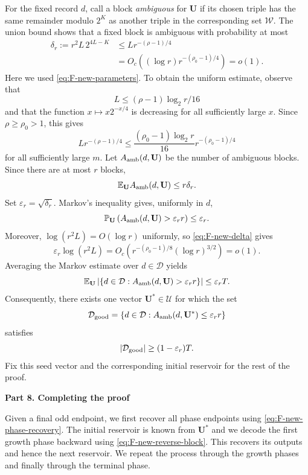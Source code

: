 \documentclass{article}
\theoremstyle{definition}
\begin{document}
For the fixed record $d$, call a block \emph{ambiguous} for $\mathbf U$ if
its chosen triple has the same remainder modulo $2^K$ as another triple in the
corresponding set $\mathcal W$.  The union bound shows that a fixed block is
ambiguous with probability at most
\begin{equation}
\begin{aligned}
\delta_r:=r^2L\,2^{4L-K}
&\le Lr^{-(\rho-1)/4}\\
&=O_c\left((\log r)r^{-(\rho_0-1)/4}\right)=o(1).
\end{aligned}
\label{eq:F-new-delta}
\end{equation}
Here we used \eqref{eq:F-new-parameters}. To obtain the
uniform estimate, observe that $$L\le(\rho-1)\log_2r/16$$
and that the function $x\mapsto x2^{-x/4}$ is decreasing
for all sufficiently large $x$. Since $\rho\ge\rho_0>1$,
this gives
$$
Lr^{-(\rho-1)/4}
\le\frac{(\rho_0-1)\log_2r}{16}
 r^{-(\rho_0-1)/4}
$$
for all sufficiently large $m$.  Let
$A_{\rm amb}(d,\mathbf U)$ be the number of ambiguous blocks.  Since there
are at most $r$ blocks,
$$
 \mathbb E_{\mathbf U}A_{\rm amb}(d,\mathbf U)\leq r\delta_r.
$$
Set $\varepsilon_r=\sqrt{\delta_r}$.  Markov's inequality gives, uniformly in
$d$,
$$
 \mathbb P_{\mathbf U}
 \left(A_{\rm amb}(d,\mathbf U)>\varepsilon_rr\right)
 \leq\varepsilon_r.
$$
Moreover, $\log(r^2L)=O(\log r)$ uniformly, so
\eqref{eq:F-new-delta} gives
\begin{equation}
\varepsilon_r\log(r^2L)
=O_c\left(r^{-(\rho_0-1)/8}(\log r)^{3/2}\right)=o(1).
\label{eq:F-new-epsilon}
\end{equation}
Averaging the Markov estimate over $d\in\mathcal D$ yields
$$
 \mathbb E_{\mathbf U}
 \left|\{d\in\mathcal D:
 A_{\rm amb}(d,\mathbf U)>\varepsilon_rr\}\right|
 \leq\varepsilon_rT.
$$
Consequently, there exists one vector $\mathbf U^*\in\mathcal U$ for which
the set
$$
 \mathcal D_{\rm good}
 =\{d\in\mathcal D:A_{\rm amb}(d,\mathbf U^*)\leq\varepsilon_rr\}
$$
satisfies
\begin{equation}
 |\mathcal D_{\rm good}|\geq(1-\varepsilon_r)T.
 \label{eq:F-new-good-records}
\end{equation}
Fix this seed vector and the corresponding initial reservoir for the rest of
the proof.

\vskip 10pt

\noindent
{\bf Part 8. Completing the proof}


Given a final odd endpoint, we first recover all phase endpoints using
\eqref{eq:F-new-phase-recovery}.  The initial reservoir is known from
$\mathbf U^*$ and we decode the first growth phase backward using
\eqref{eq:F-new-reverse-block}. This recovers its outputs and hence the next
reservoir. We repeat the process through the growth phases and finally
through the terminal phase.
\end{document}
